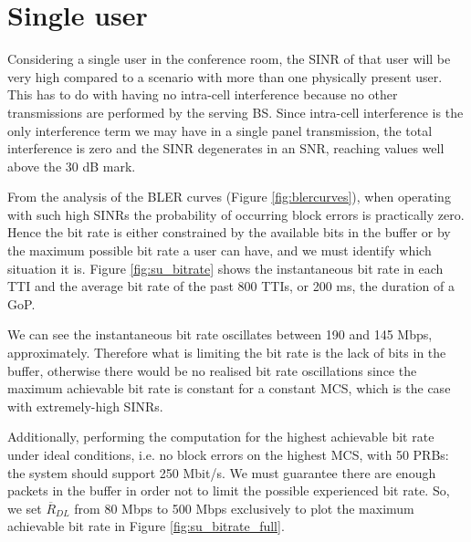 \section{Single user} \label{sec:single-user}

Considering a single user in the conference room, the SINR of that user will be very high compared to a scenario with more than one physically present user. This has to do with having no intra-cell interference because no other transmissions are performed by the serving \acs{BS}. Since intra-cell interference is the only interference term we may have in a single panel transmission, the total interference is zero and the SINR degenerates in an SNR, reaching values well above the 30 dB mark.

From the analysis of the BLER curves (Figure \ref{fig:blercurves}), when operating with such high SINRs the probability of occurring block errors is practically zero. Hence the bit rate is either constrained by the available bits in the buffer or by the maximum possible bit rate a user can have, and we must identify which situation it is. Figure \ref{fig:su_bitrate} shows the instantaneous bit rate in each TTI and the average bit rate of the past 800 TTIs, or 200 ms, the duration of a \ac{GoP}.

We can see the instantaneous bit rate oscillates between 190 and 145 Mbps, approximately. Therefore what is limiting the bit rate is the lack of bits in the buffer, otherwise there would be no realised bit rate oscillations since the maximum achievable bit rate is constant for a constant MCS, which is the case with extremely-high \acsp{SINR}.




Additionally, performing the computation for the highest achievable bit rate under ideal conditions, i.e. no block errors on the highest \acs{MCS}, with 50 \acsp{PRB}: the system should support 250 Mbit/s. We must guarantee there are enough packets in the buffer in order not to limit the possible experienced bit rate. So, we set $\overline{R}_{DL}$ from 80 Mbps to 500 Mbps exclusively to plot the maximum achievable bit rate in Figure \ref{fig:su_bitrate_full}. 

